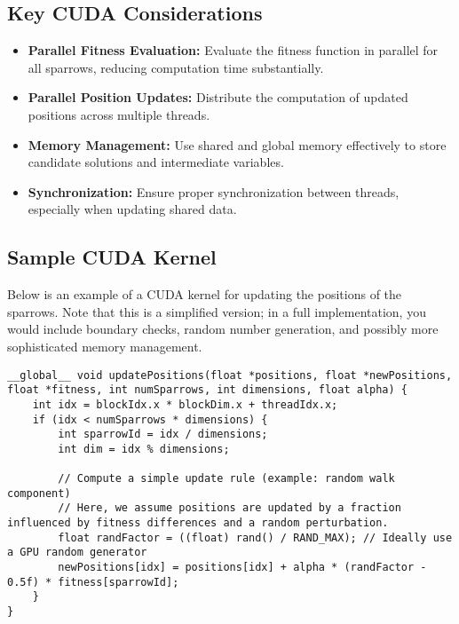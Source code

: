 \documentclass[11pt]{article}
\begin{document}
\subsection{Key CUDA Considerations}
\begin{itemize}
    \item \textbf{Parallel Fitness Evaluation:} Evaluate the fitness function in parallel for all sparrows, reducing computation time substantially.
    \item \textbf{Parallel Position Updates:} Distribute the computation of updated positions across multiple threads.
    \item \textbf{Memory Management:} Use shared and global memory effectively to store candidate solutions and intermediate variables.
    \item \textbf{Synchronization:} Ensure proper synchronization between threads, especially when updating shared data.
\end{itemize}

\subsection{Sample CUDA Kernel}
Below is an example of a CUDA kernel for updating the positions of the sparrows. Note that this is a simplified version; in a full implementation, you would include boundary checks, random number generation, and possibly more sophisticated memory management.

\begin{lstlisting}[caption={CUDA Kernel for SSA Position Update}]
__global__ void updatePositions(float *positions, float *newPositions, float *fitness, int numSparrows, int dimensions, float alpha) {
    int idx = blockIdx.x * blockDim.x + threadIdx.x;
    if (idx < numSparrows * dimensions) {
        int sparrowId = idx / dimensions;
        int dim = idx % dimensions;

        // Compute a simple update rule (example: random walk component)
        // Here, we assume positions are updated by a fraction influenced by fitness differences and a random perturbation.
        float randFactor = ((float) rand() / RAND_MAX); // Ideally use a GPU random generator
        newPositions[idx] = positions[idx] + alpha * (randFactor - 0.5f) * fitness[sparrowId];
    }
}
\end{lstlisting}
\end{document}
